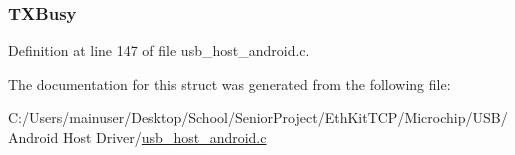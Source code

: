 \subsubsection[{T\+X\+Busy}]{ T\+X\+Busy}\label{struct_a_n_d_r_o_i_d___d_e_v_i_c_e___d_a_t_a_a08f573c5e6a4e5021a4836ec632afd7e}


Definition at line 147 of file usb\+\_\+host\+\_\+android.\+c.



The documentation for this struct was generated from the following file\+:\begin{DoxyCompactItemize}
\item 
C\+:/\+Users/mainuser/\+Desktop/\+School/\+Senior\+Project/\+Eth\+Kit\+T\+C\+P/\+Microchip/\+U\+S\+B/\+Android Host Driver/\hyperlink{usb__host__android_8c}{usb\+\_\+host\+\_\+android.\+c}\end{DoxyCompactItemize}
